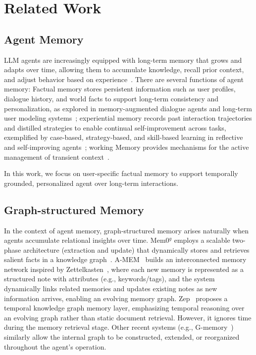 \documentclass[11pt]{article}
\begin{document}
\section{Related Work} 

\subsection{Agent Memory}

LLM agents are increasingly equipped with long-term memory that grows and adapts over time, allowing them to accumulate knowledge, recall prior context, and adjust behavior based on experience~\citep{owl2025, openmanus2025, google2025deepresearch, bytedance2025deerflow}. There are several functions of agent memory: 
Factual memory stores persistent information such as user profiles, dialogue history, and world facts to support long-term consistency and personalization, as explored in memory-augmented dialogue agents and long-term user modeling systems~\citep{park_generative_2023, packer_memgpt_2024,nan_nemori_2025,kwon_embodied_2025};
experiential memory records past interaction trajectories and distilled strategies to enable continual self-improvement across tasks, exemplified by case-based, strategy-based, and skill-based learning in reflective and self-improving agents~\citep{shinn2023reflexion,yan_memory-r1_2025,zhou_mem1_2025,ouyang_reasoningbank_2025};
working Memory provides mechanisms for the active management of transient context~\cite{zhou_mem1_2025,zhang_memgen_2025}.

In this work, we focus on user-specific factual memory to support temporally grounded, personalized agent over long-term interactions.

\subsection{Graph-structured Memory }
In the context of agent memory, graph-structured memory arises naturally when agents accumulate relational insights over time. %
Mem0$^{g}$ employs a scalable two-phase architecture (extraction and update) that dynamically stores and retrieves salient facts in a knowledge graph~\cite{chhikara2025mem0}.
A-MEM~\cite{xu2025mem} builds an interconnected memory network inspired by Zettelkasten~\cite{kadavy_digital_2021}, where each new memory is represented as a structured note with attributes (e.g., keywords/tags), and the system dynamically links related memories and updates existing notes as new information arrives, enabling an evolving memory graph.
Zep~\cite{rasmussen_zep_2025} proposes a temporal knowledge graph memory layer, emphasizing temporal reasoning over an evolving graph rather than static document retrieval. However, it ignores time during the memory retrieval stage. Other recent systems (e.g., G-memory~\cite{zhang_g-memory_2025}) similarly allow the internal graph to be constructed, extended, or reorganized throughout the agent's operation.
\end{document}
